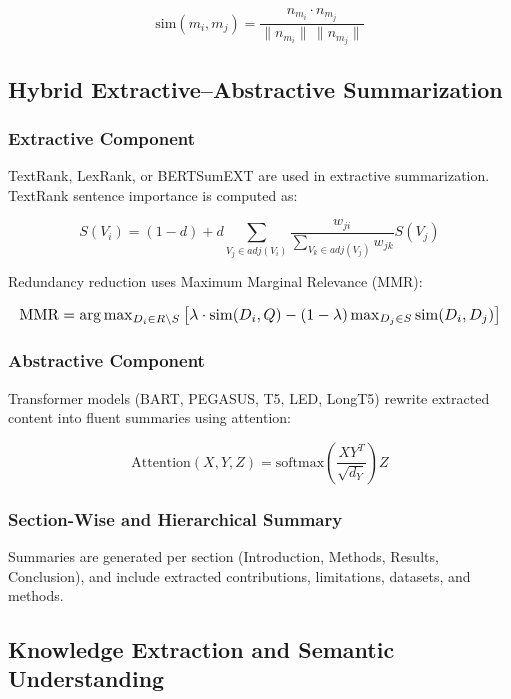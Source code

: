 \documentclass[conference]{IEEEtran}
\begin{document}
\begin{equation}
    \text{sim}(m_i, m_j) = 
    \frac{n_{m_i} \cdot n_{m_j}}
    {\| n_{m_i} \| \, \| n_{m_j} \|}
\end{equation}

\subsection{Hybrid Extractive--Abstractive Summarization}

\subsubsection{Extractive Component}
TextRank, LexRank, or BERTSumEXT are used in extractive summarization. TextRank sentence
importance is computed as:

\begin{equation}
    S(V_i) = (1 - d) + d \sum_{V_j \in adj(V_i)}
    \frac{w_{ji}}
    {
        \sum_{V_k \in adj(V_j)} w_{jk}
    } S(V_j)
\end{equation}

Redundancy reduction uses Maximum Marginal Relevance (MMR):

\begin{equation}
\resizebox{\columnwidth}{!}{$
\text{MMR} = 
\arg\max_{D_i \in R \setminus S}
\left[
\lambda \cdot \text{sim}(D_i, Q)
-
(1 - \lambda) 
\max_{D_j \in S} \text{sim}(D_i, D_j)
\right]
$}
\end{equation}

\subsubsection{Abstractive Component}
Transformer models (BART, PEGASUS, T5, LED, LongT5) rewrite extracted content into fluent summaries using attention:

\begin{equation}
    \text{Attention}(X,Y,Z) = 
    \text{softmax}\left(
    \frac{XY^T}{\sqrt{d_Y}}
    \right)Z
\end{equation}

\subsubsection{Section-Wise and Hierarchical Summary}
Summaries are generated per section (Introduction, Methods, Results, Conclusion), and include extracted contributions, limitations, datasets, and methods.

\subsection{Knowledge Extraction and Semantic Understanding}
\end{document}

